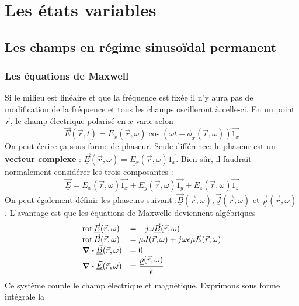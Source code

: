 \chapter{Les états variables}
\section{Les champs en régime sinusoïdal permanent}
	\subsection{Les équations de Maxwell}	
	Si le milieu est linéaire et que la fréquence est fixée il  n'y aura pas de modification 
	de la fréquence et tous les champs oscilleront à celle-ci. En un point $\vec{r}$, le champ 
	électrique polarisé en $x$ varie selon
	\begin{equation}
	\vec{E}(\vec{r},t) = E_x(\vec{r},\omega)\cos(\omega t + \phi_x(\vec{r},\omega))\vec{1_x}
	\end{equation}
	On peut écrire ça sous forme de phaseur. Seule différence: le phaseur est un \textbf{vecteur 
	complexe} : $\underline{\vec{E}}(\vec{r},\omega) = \underline{E_x}(\vec{r},\omega)\vec{1_x}$.
	Bien sûr, il faudrait normalement considérer les trois composantes :
	\begin{equation}
	\underline{\vec{E}} = \underline{E_x}(\vec{r},\omega)\vec{1_x}+\underline{E_y}(\vec{r}
	,\omega)\vec{1_y}+\underline{E_z}(\vec{r},\omega)\vec{1_z}
	\end{equation}
	On peut également définir les phaseurs suivant :$\underline{\vec{B}}(\vec{r},\omega), 
	\underline{\vec{J}}(\vec{r},\omega)$ et $\underline{\vec{\rho}}(\vec{r},\omega)$. L'avantage 
	est que les équations de Maxwelle deviennent algébriques
	\begin{equation}
	\begin{array}{ll}
	\rot \underline{\vec{E}}(\vec{r},\omega) &= -j\omega\underline{\vec{B}}(\vec{r},\omega)\\
	\rot \underline{\vec{B}}	(\vec{r},\omega) &= \mu\underline{\vec{J}}(\vec{r},\omega) +
	j\omega\epsilon\mu\underline{\vec{E}}(\vec{r},\omega)\\
	\div \underline{\vec{B}}(\vec{r},\omega) &= 0\\
	\div \underline{\vec{E}}(\vec{r},\omega) &= \dfrac{\underline{\rho}(\vec{r},\omega)}{\epsilon}
	\end{array}
	\end{equation}
	Ce système couple le champ électrique et magnétique. Exprimons sous forme intégrale la 

